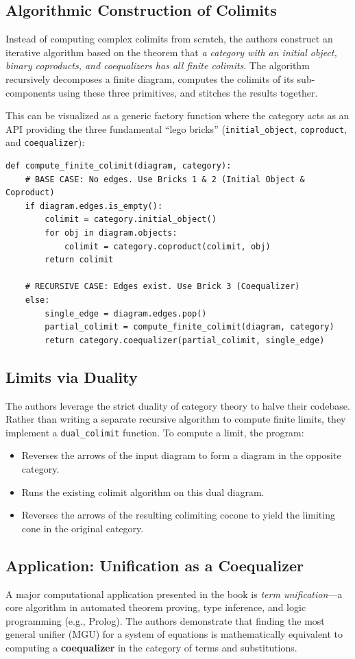 \documentclass{article}
\begin{document}
\subsection{Algorithmic Construction of Colimits}
Instead of computing complex colimits from scratch, the authors construct an iterative algorithm based on the theorem that \textit{a category with an initial object, binary coproducts, and coequalizers has all finite colimits}. The algorithm recursively decomposes a finite diagram, computes the colimits of its sub-components using these three primitives, and stitches the results together.

This can be visualized as a generic factory function where the category acts as an API providing the three fundamental ``lego bricks'' (\texttt{initial\_object}, \texttt{coproduct}, and \texttt{coequalizer}):

\begin{verbatim}
def compute_finite_colimit(diagram, category):
    # BASE CASE: No edges. Use Bricks 1 & 2 (Initial Object & Coproduct)
    if diagram.edges.is_empty():
        colimit = category.initial_object()
        for obj in diagram.objects:
            colimit = category.coproduct(colimit, obj)
        return colimit

    # RECURSIVE CASE: Edges exist. Use Brick 3 (Coequalizer)
    else:
        single_edge = diagram.edges.pop()
        partial_colimit = compute_finite_colimit(diagram, category)
        return category.coequalizer(partial_colimit, single_edge)
\end{verbatim}

\subsection{Limits via Duality}
The authors leverage the strict duality of category theory to halve their codebase. Rather than writing a separate recursive algorithm to compute finite limits, they implement a \texttt{dual\_colimit} function. To compute a limit, the program:
\begin{itemize}
    \item Reverses the arrows of the input diagram to form a diagram in the opposite category.
    \item Runs the existing colimit algorithm on this dual diagram.
    \item Reverses the arrows of the resulting colimiting cocone to yield the limiting cone in the original category.
\end{itemize}

\subsection{Application: Unification as a Coequalizer}
A major computational application presented in the book is \textit{term unification}---a core algorithm in automated theorem proving, type inference, and logic programming (e.g., Prolog). The authors demonstrate that finding the most general unifier (MGU) for a system of equations is mathematically equivalent to computing a \textbf{coequalizer} in the category of terms and substitutions.
\end{document}
